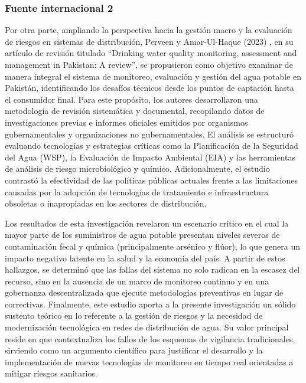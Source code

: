 \subsubsection{Fuente internacional 2}

Por otra parte, ampliando la perspectiva hacia la gestión macro y la evaluación de riesgos en sistemas de distribución, Perveen y Amar-Ul-Haque (2023) \cite{Perveen2023}, en su artículo de revisión titulado “Drinking water quality monitoring, assessment and management in Pakistan: A review”, se propusieron como objetivo examinar de manera integral el sistema de monitoreo, evaluación y gestión del agua potable en Pakistán, identificando los desafíos técnicos desde los puntos de captación hasta el consumidor final. Para este propósito, los autores desarrollaron una metodología de revisión sistemática y documental, recopilando datos de investigaciones previas e informes oficiales emitidos por organismos gubernamentales y organizaciones no gubernamentales. El análisis se estructuró evaluando tecnologías y estrategias críticas como la Planificación de la Seguridad del Agua (WSP), la Evaluación de Impacto Ambiental (EIA) y las herramientas de análisis de riesgo microbiológico y químico. Adicionalmente, el estudio contrastó la efectividad de las políticas públicas actuales frente a las limitaciones causadas por la adopción de tecnologías de tratamiento e infraestructura obsoletas o inapropiadas en los sectores de distribución.

Los resultados de esta investigación revelaron un escenario crítico en el cual la mayor parte de los suministros de agua potable presentan niveles severos de contaminación fecal y química (principalmente arsénico y flúor), lo que genera un impacto negativo latente en la salud y la economía del país. A partir de estos hallazgos, se determinó que las fallas del sistema no solo radican en la escasez del recurso, sino en la ausencia de un marco de monitoreo continuo y en una gobernanza descentralizada que ejecute metodologías preventivas en lugar de correctivas. Finalmente, este estudio aporta a la presente investigación un sólido sustento teórico en lo referente a la gestión de riesgos y la necesidad de modernización tecnológica en redes de distribución de agua. Su valor principal reside en que contextualiza los fallos de los esquemas de vigilancia tradicionales, sirviendo como un argumento científico para justificar el desarrollo y la implementación de nuevas tecnologías de monitoreo en tiempo real orientadas a mitigar riesgos sanitarios.

